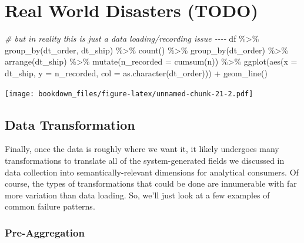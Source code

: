 \documentclass[
]{krantz}
\makeatletter
\newenvironment{Shaded}{\begin{snugshade}}{\end{snugshade}}
\newcommand{\AttributeTok}[1]{\textcolor[rgb]{0.61,0.61,0.61}{#1}}
\newcommand{\CommentTok}[1]{\textcolor[rgb]{0.37,0.37,0.37}{\textit{#1}}}
\newcommand{\FunctionTok}[1]{\textcolor[rgb]{0,0,0}{#1}}
\newcommand{\NormalTok}[1]{#1}
\newcommand{\SpecialCharTok}[1]{\textcolor[rgb]{0,0,0}{#1}}
\newenvironment{kframe}{%
\medskip{}
\setlength{\fboxsep}{.8em}
 \def\at@end@of@kframe{}%
 \ifinner\ifhmode%
  \def\at@end@of@kframe{\end{minipage}}%
  \begin{minipage}{\columnwidth}%
 \fi\fi%
 \def\FrameCommand##1{\hskip\@totalleftmargin \hskip-\fboxsep
 \colorbox{shadecolor}{##1}\hskip-\fboxsep
     \hskip-\linewidth \hskip-\@totalleftmargin \hskip\columnwidth}%
 \MakeFramed {\advance\hsize-\width
   \@totalleftmargin\z@ \linewidth\hsize
   \@setminipage}}%
 {\par\unskip\endMakeFramed%
 \at@end@of@kframe}
\renewenvironment{Shaded}{\begin{kframe}}{\end{kframe}}
\makeatother
\begin{document}
\hypertarget{real-world-disasters-todo}{%
\section{Real World Disasters (TODO)}\label{real-world-disasters-todo}}

\begin{Shaded}
\begin{Highlighting}[]
\CommentTok{\# but in reality this is just a data loading/recording issue {-}{-}{-}{-}}
\NormalTok{df }\SpecialCharTok{\%\textgreater{}\%}
  \FunctionTok{group\_by}\NormalTok{(dt\_order, dt\_ship) }\SpecialCharTok{\%\textgreater{}\%}
  \FunctionTok{count}\NormalTok{() }\SpecialCharTok{\%\textgreater{}\%}
  \FunctionTok{group\_by}\NormalTok{(dt\_order) }\SpecialCharTok{\%\textgreater{}\%}
  \FunctionTok{arrange}\NormalTok{(dt\_ship) }\SpecialCharTok{\%\textgreater{}\%}
  \FunctionTok{mutate}\NormalTok{(}\AttributeTok{n\_recorded =} \FunctionTok{cumsum}\NormalTok{(n)) }\SpecialCharTok{\%\textgreater{}\%}
  \FunctionTok{ggplot}\NormalTok{(}\FunctionTok{aes}\NormalTok{(}\AttributeTok{x =}\NormalTok{ dt\_ship, }\AttributeTok{y =}\NormalTok{ n\_recorded, }\AttributeTok{col =} \FunctionTok{as.character}\NormalTok{(dt\_order))) }\SpecialCharTok{+} \FunctionTok{geom\_line}\NormalTok{()}
\end{Highlighting}
\end{Shaded}

\texttt{[image: bookdown\_files/figure-latex/unnamed-chunk-21-2.pdf]}

\hypertarget{data-transformation-1}{%
\subsection{Data Transformation}\label{data-transformation-1}}

Finally, once the data is roughly where we want it, it likely undergoes many transformations to translate all of the system-generated fields we discussed in data collection into semantically-relevant dimensions for analytical consumers. Of course, the types of transformations that could be done are innumerable with far more variation than data loading. So, we'll just look at a few examples of common failure patterns.

\hypertarget{pre-aggregation-1}{%
\subsubsection{Pre-Aggregation}\label{pre-aggregation-1}}
\end{document}
